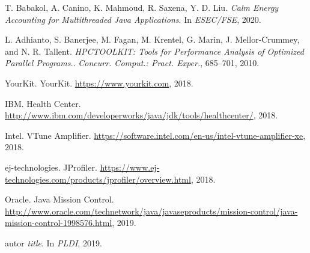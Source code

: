 \documentclass[]{usiinfthesis}
\begin{document}
\begin{thebibliography}{9}
T. Babakol, A. Canino, K. Mahmoud, R. Saxena, Y. D. Liu.
\textit{Calm Energy Accounting for Multithreaded Java Applications}. 
In \textit{ESEC/FSE}, 2020.

L. Adhianto, S. Banerjee, M. Fagan, M. Krentel, G. Marin, J. Mellor-Crummey, and N. R. Tallent.
\textit{HPCTOOLKIT: Tools for Performance Analysis of Optimized Parallel Programs.}. 
\textit{Concurr. Comput.: Pract. Exper.}, 685–701, 2010.

YourKit. YourKit. \url{https://www.yourkit.com}, 2018.

IBM. Health Center. \url{http://www.ibm.com/developerworks/java/jdk/tools/healthcenter/}, 2018.

Intel. VTune Amplifier. \url{https://software.intel.com/en-us/intel-vtune-amplifier-xe}, 2018.

ej-technologies. JProfiler. \url{https://www.ej-technologies.com/products/jprofiler/overview.html}, 2018.

Oracle. Java Mission Control. \url{http://www.oracle.com/technetwork/java/javaseproducts/mission-control/java-mission-control-1998576.html}, 2019.

autor
\textit{title}. 
In \textit{PLDI}, 2019.





\end{thebibliography}
\end{document}
